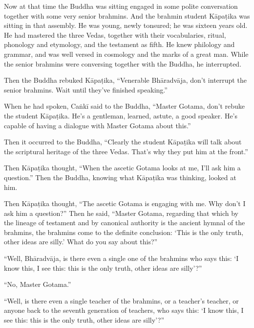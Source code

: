 \documentclass[12pt,openany]{book}%
\begin{document}
Now at that time the Buddha was sitting engaged in some polite conversation together with some very senior brahmins. And the brahmin student \textsanskrit{Kāpaṭika} was sitting in that assembly. He was young, newly tonsured; he was sixteen years old. He had mastered the three Vedas, together with their vocabularies, ritual, phonology and etymology, and the testament as fifth. He knew philology and grammar, and was well versed in cosmology and the marks of a great man. While the senior brahmins were conversing together with the Buddha, he interrupted. 

Then the Buddha rebuked \textsanskrit{Kāpaṭika}, “Venerable \textsanskrit{Bhāradvāja}, don’t interrupt the senior brahmins. Wait until they’ve finished speaking.” 

When he had spoken, \textsanskrit{Caṅkī} said to the Buddha, “Master Gotama, don’t rebuke the student \textsanskrit{Kāpaṭika}. He’s a gentleman, learned, astute, a good speaker. He’s capable of having a dialogue with Master Gotama about this.” 

Then it occurred to the Buddha, “Clearly the student \textsanskrit{Kāpaṭika} will talk about the scriptural heritage of the three Vedas. That’s why they put him at the front.” 

Then \textsanskrit{Kāpaṭika} thought, “When the ascetic Gotama looks at me, I’ll ask him a question.” Then the Buddha, knowing what \textsanskrit{Kāpaṭika} was thinking, looked at him. 

Then \textsanskrit{Kāpaṭika} thought, “The ascetic Gotama is engaging with me. Why don’t I ask him a question?” Then he said, “Master Gotama, regarding that which by the lineage of testament and by canonical authority is the ancient hymnal of the brahmins, the brahmins come to the definite conclusion: ‘This is the only truth, other ideas are silly.’ What do you say about this?” 

“Well, \textsanskrit{Bhāradvāja}, is there even a single one of the brahmins who says this: ‘I know this, I see this: this is the only truth, other ideas are silly’?” 

“No, Master Gotama.” 

“Well, is there even a single teacher of the brahmins, or a teacher’s teacher, or anyone back to the seventh generation of teachers, who says this: ‘I know this, I see this: this is the only truth, other ideas are silly’?” 
\end{document}

